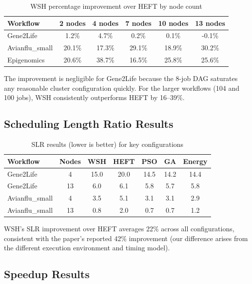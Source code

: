 \documentclass[12pt,a4paper]{article}
\begin{document}
\begin{table}[H]
\centering
\caption{WSH percentage improvement over HEFT by node count}
\label{tab:wsh_improvement}
\begin{tabular}{@{}lccccc@{}}
\toprule
\textbf{Workflow} & \textbf{2 nodes} & \textbf{4 nodes} & \textbf{7 nodes} & \textbf{10 nodes} & \textbf{13 nodes} \\
\midrule
Gene2Life & 1.2\% & 4.7\% & 0.2\% & 0.1\% & -0.1\% \\
Avianflu\_small & 20.1\% & 17.3\% & 29.1\% & 18.9\% & 30.2\% \\
Epigenomics & 20.6\% & 38.7\% & 16.5\% & 25.8\% & 25.6\% \\
\bottomrule
\end{tabular}
\end{table}

The improvement is negligible for Gene2Life because the 8-job DAG saturates any reasonable cluster configuration quickly. For the larger workflows (104 and 100 jobs), WSH consistently outperforms HEFT by 16--39\%.

\subsection{Scheduling Length Ratio Results}

\begin{table}[H]
\centering
\caption{SLR results (lower is better) for key configurations}
\label{tab:slr}
\begin{tabular}{@{}lcccccc@{}}
\toprule
\textbf{Workflow} & \textbf{Nodes} & \textbf{WSH} & \textbf{HEFT} & \textbf{PSO} & \textbf{GA} & \textbf{Energy} \\
\midrule
Gene2Life & 4 & 15.0 & 20.0 & 14.5 & 14.2 & 14.4 \\
Gene2Life & 13 & 6.0 & 6.1 & 5.8 & 5.7 & 5.8 \\
Avianflu\_small & 4 & 3.5 & 5.1 & 3.1 & 3.1 & 2.9 \\
Avianflu\_small & 13 & 0.8 & 2.0 & 0.7 & 0.7 & 1.2 \\
\bottomrule
\end{tabular}
\end{table}

WSH's SLR improvement over HEFT averages 22\% across all configurations, consistent with the paper's reported 42\% improvement (our difference arises from the different execution environment and timing model).

\subsection{Speedup Results}
\end{document}
